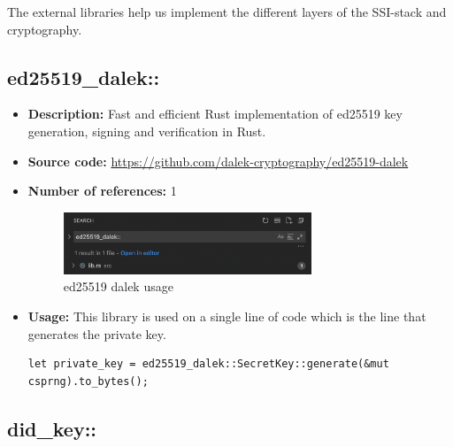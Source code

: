The external libraries help us implement the different layers of the
SSI-stack and cryptography.

\hypertarget{ed25519_dalek}{%
\subsection{ed25519\_dalek::}\label{ed25519_dalek}}

\begin{itemize}
\item
  \textbf{Description:} Fast and efficient Rust implementation of
  ed25519 key generation, signing and verification in Rust.
\item
  \textbf{Source code:}
  \url{https://github.com/dalek-cryptography/ed25519-dalek}
\item
  \textbf{Number of references:} 1

  \begin{figure}
  \centering
  \includegraphics[width=0.7\textwidth]{Architecture 1442df162dbe45f4a423ba37d3e12363/Untitled 7.png}
  \caption{ed25519 dalek usage}
  \end{figure}
\item
  \textbf{Usage:} This library is used on a single line of code which is
  the line that generates the private key.

\begin{lstlisting}
let private_key = ed25519_dalek::SecretKey::generate(&mut csprng).to_bytes();
\end{lstlisting}
\end{itemize}


\pagebreak





\hypertarget{did_key}{%
\subsection{did\_key::}\label{did_key}}


